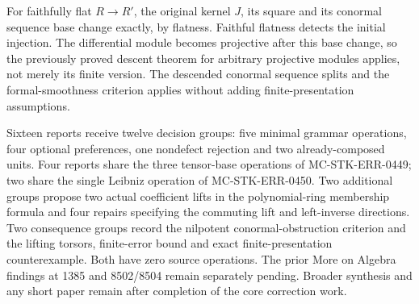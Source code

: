 For faithfully flat \(R\to R'\), the original kernel \(J\), its square and its conormal sequence base change exactly, by flatness. Faithful flatness detects the initial injection. The differential module becomes projective after this base change, so the previously proved descent theorem for arbitrary projective modules applies, not merely its finite version. The descended conormal sequence splits and the formal-smoothness criterion applies without adding finite-presentation assumptions.

Sixteen reports receive twelve decision groups: five minimal grammar operations, four optional preferences, one nondefect rejection and two already-composed units. Four reports share the three tensor-base operations of MC-STK-ERR-0449; two share the single Leibniz operation of MC-STK-ERR-0450. Two additional groups propose two actual coefficient lifts in the polynomial-ring membership formula and four repairs specifying the commuting lift and left-inverse directions. Two consequence groups record the nilpotent conormal-obstruction criterion and the lifting torsors, finite-error bound and exact finite-presentation counterexample. Both have zero source operations. The prior More on Algebra findings at 1385 and 8502/8504 remain separately pending. Broader synthesis and any short paper remain after completion of the core correction work.
